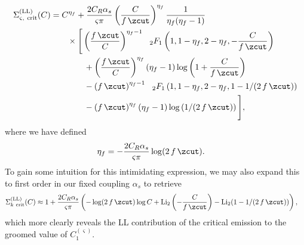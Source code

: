 \begin{equation}
\begin{aligned}
    \Sigma^{\rm(LL)}_{\varsigma,~{\rm crit}} (C)
    &=
    C^{\eta_f}
    + \frac{2C_R\alpha_s}
    {\varsigma \pi}
    \left(
        \frac{C}{f\,\zcut}
    \right)
    ^{\eta_f}
    \frac{1}{\eta_f(\eta_f-1)}
    \\
    &~~~~~~
    \times
    \Bigg[
        \left(
        \frac{f\,\zcut}{C}
        \right)
        ^{\eta_f - 1}
        {}_{~~2}F_1
        \left(
            1, 1-\eta_f, 2-\eta_f,
            -\frac{C}{f\,\zcut}
        \right)
        \\
        &~~~~~~~~~~~~
        +
        \left(
        \frac{f\,\zcut}{C}
        \right)
        ^{\eta_f}
        \left(\eta_f-1\right)
        \log\left(
        1 + \frac{C} {f\,\zcut}
        \right)
        \\
        &~~~~~~~~~~~~
        -\left(f\,\zcut\right)
        ^{\eta_f - 1}
        {}_{~~2}F_1
        \left(
            1,1-\eta_f,2-\eta_f,
            1-1/(2\,f\,\zcut)
        \right)
        \\
        &~~~~~~~~~~~~
        -
        \left(f\,\zcut\right)
        ^{\eta_f}
        \left(\eta_f-1\right)
        \log\left(1/(2\,f\,\zcut)\right)
    \Bigg]
    ,
    \label{eqn:ECF_LL}
\end{aligned}
\end{equation}
%
where we have defined
\begin{align}
    \eta_f
    &=
    -\frac{2 C_R \alpha_s}{\varsigma \pi}
    \log(2\,f\,\zcut)
    .
\end{align}
%
To gain some intuition for this intimidating expression, we may also expand this to first order in our fixed coupling \(\alpha_s\) to retrieve
%
\begin{equation}
\begin{aligned}
    \Sigma^{\rm(LL)}_{k~{\rm crit}} (C)
    &\approx
    1 + \frac{2 C_R \alpha_s} {\varsigma \pi}
    \left(
        -\log(2\,f\,\zcut)
        \log C
        +
        {\rm Li}_2
        \left(
        -\frac{C}{f\,\zcut}
        \right)
        -
        {\rm Li}_2(1 - 1/(2\,f\,\zcut))
    \right)
    ,
    \label{eqn:convolDistExpansion}
\end{aligned}
\end{equation}
%
which more clearly reveals the LL contribution of the critical emission to the groomed value of \(C_1^{(\varsigma)}\).

